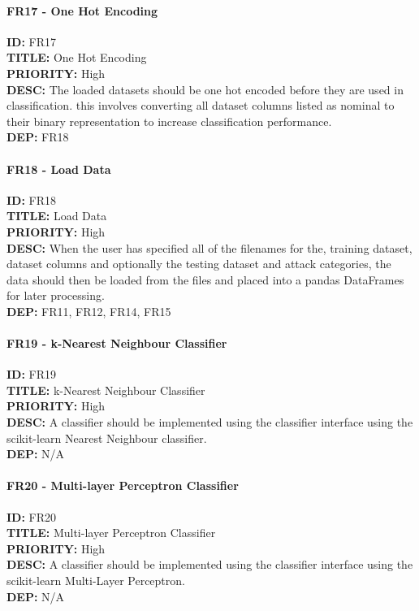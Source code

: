\paragraph*{FR17 - One Hot Encoding}
\textbf{ID:} FR17 \\
\textbf{TITLE:} One Hot Encoding \\
\textbf{PRIORITY:} High \\
\textbf{DESC:} The loaded datasets should be one hot encoded before they are used in classification. this involves converting all dataset columns listed as nominal to their binary representation to increase classification performance.  \\
\textbf{DEP:} FR18
\paragraph*{FR18 - Load Data}
\textbf{ID:} FR18 \\
\textbf{TITLE:} Load Data \\
\textbf{PRIORITY:} High \\
\textbf{DESC:} When the user has specified all of the filenames for the, training dataset, dataset columns and optionally the testing dataset and attack categories, the data should then be loaded from the files and placed into a pandas DataFrames for later processing. \\
\textbf{DEP:} FR11, FR12, FR14, FR15
\paragraph*{FR19 - k-Nearest Neighbour Classifier}
\textbf{ID:} FR19 \\
\textbf{TITLE:} k-Nearest Neighbour Classifier \\
\textbf{PRIORITY:} High \\
\textbf{DESC:} A classifier should be implemented using the classifier interface using the scikit-learn Nearest Neighbour classifier. \\
\textbf{DEP:} N/A
\paragraph*{FR20 - Multi-layer Perceptron Classifier}
\textbf{ID:} FR20 \\
\textbf{TITLE:} Multi-layer Perceptron Classifier \\
\textbf{PRIORITY:} High \\
\textbf{DESC:}  A classifier should be implemented using the classifier interface using the scikit-learn Multi-Layer Perceptron. \\
\textbf{DEP:} N/A

